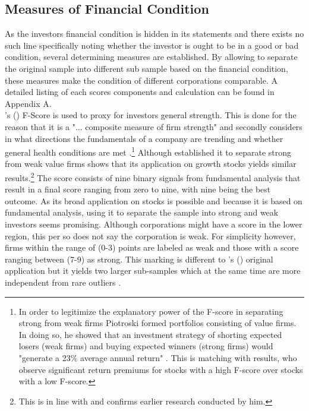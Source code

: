 \documentclass[12pt]{article}
\begin{document}
\subsection{Measures of Financial Condition}
As the investors financial condition is hidden in its statements and there exists no such line specifically noting whether the investor is ought to be in a good or bad condition, several determining measures are established. By allowing to separate the original sample into different sub sample based on the financial condition, these measures make the condition of different corporations comparable. A detailed listing of each scores components and calculation can be found in Appendix A.\\
\citeauthor{Piotroski2000}'s (\citeyear{Piotroski2000}) F-Score is used to proxy for investors general strength. This is done for the reason that it is a "... composite measure of firm strength" \citep[p. 496]{Fama2006} and secondly considers in what directions the fundamentals of a company are trending and whether general health conditions are met \citep[p.5]{Mohr2012}.\footnote{In order to legitimize the explanatory power of the F-score in separating strong from weak firms Piotroski formed portfolios consisting of value firms. In doing so, he showed that an investment strategy of shorting expected losers (weak firms) and buying expected winners (strong firms) would "generate a 23\% average annual return" \citep[p. 4]{Piotroski2000}. This is matching with \citet{Hyde2014} results, who observe significant return premiums for stocks with a high F-score over stocks with a low F-score.} Although \citet[p.6]{Piotroski2000} established it to separate strong from weak value firms \citet[p.16]{Mohr2012} shows that its application on growth stocks yields similar results.\footnote{This is in line with \citet{Piotroski2000} and confirms earlier research conducted by him.} The score consists of nine binary signals from fundamental analysis that result in a final score ranging from zero to nine, with nine being the best outcome. As its broad application on stocks is possible and because it is based on fundamental analysis, using it to separate the sample into strong and weak investors seems promising.  
Although corporations might have a score in the lower region, this per so does not say the corporation is weak. For simplicity however, firms within the range of (0-3) points are labeled as weak and those with a score ranging between (7-9) as strong. This marking is different to \citeauthor{Piotroski2000}'s (\citeyear{Piotroski2000}) original application but it yields two larger sub-samples which at the same time are more independent from rare outliers \citep[p.12]{Mohr2012}.
\end{document}
